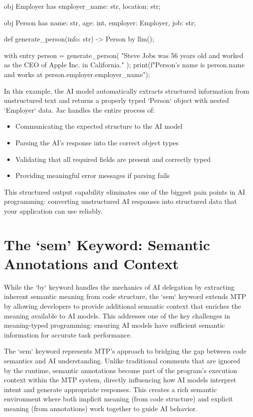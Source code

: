 \begin{jacblock}
obj Employer {
    has employer_name: str,
        location: str;
}

obj Person {
    has name: str,
        age: int,
        employer: Employer,
        job: str;
}

def generate_person(info: str) -> Person by llm();

with entry {
    person = generate_person(
        "Steve Jobs was 56 years old and worked as the CEO of Apple Inc. in California."
    );
    print(f"Person's name is {person.name} and works at {person.employer.employer_name}");
}
\end{jacblock}

In this example, the AI model automatically extracts structured information from unstructured text and returns a properly typed `Person` object with nested `Employer` data. Jac handles the entire process of:
\begin{itemize}
    \item Communicating the expected structure to the AI model
    \item Parsing the AI's response into the correct object types
    \item Validating that all required fields are present and correctly typed
    \item Providing meaningful error messages if parsing fails
\end{itemize}

This structured output capability eliminates one of the biggest pain points in AI programming: converting unstructured AI responses into structured data that your application can use reliably.

\section{The `sem' Keyword: Semantic Annotations and Context}

While the `by` keyword handles the mechanics of AI delegation by extracting inherent semantic meaning from code structure, the `sem` keyword extends MTP by allowing developers to provide additional semantic context that enriches the meaning available to AI models. This addresses one of the key challenges in meaning-typed programming: ensuring AI models have sufficient semantic information for accurate task performance.

The `sem` keyword represents MTP's approach to bridging the gap between code semantics and AI understanding. Unlike traditional comments that are ignored by the runtime, semantic annotations become part of the program's execution context within the MTP system, directly influencing how AI models interpret intent and generate appropriate responses. This creates a rich semantic environment where both implicit meaning (from code structure) and explicit meaning (from annotations) work together to guide AI behavior.

